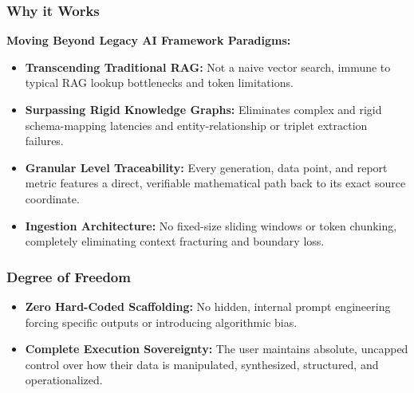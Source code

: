 \documentclass{beamer}
\begin{document}
	\begin{frame}
		\frametitle{Why it Works}
		\textbf{Moving Beyond Legacy AI Framework Paradigms:}
		\vspace{0.3cm}
		\begin{itemize}
			\item \textbf{Transcending Traditional RAG:} Not a naive vector search, immune to typical RAG lookup bottlenecks and token limitations.
			\item \textbf{Surpassing Rigid Knowledge Graphs:} Eliminates complex and rigid schema-mapping latencies and entity-relationship or triplet extraction failures.
			\item \textbf{Granular Level Traceability:} Every generation, data point, and report metric features a direct, verifiable mathematical path back to its exact source coordinate.
			\item \textbf{Ingestion Architecture:} No fixed-size sliding windows or token chunking, completely eliminating context fracturing and boundary loss.
		\end{itemize}
	\end{frame}
	
	\begin{frame}
		\frametitle{Degree of Freedom}
		\begin{itemize}
			\item \textbf{Zero Hard-Coded Scaffolding:} No hidden, internal prompt engineering forcing specific outputs or introducing algorithmic bias.
			\item \textbf{Complete Execution Sovereignty:} The user maintains absolute, uncapped control over how their data is manipulated, synthesized, structured, and operationalized.
		\end{itemize}
	\end{frame}
\end{document}
